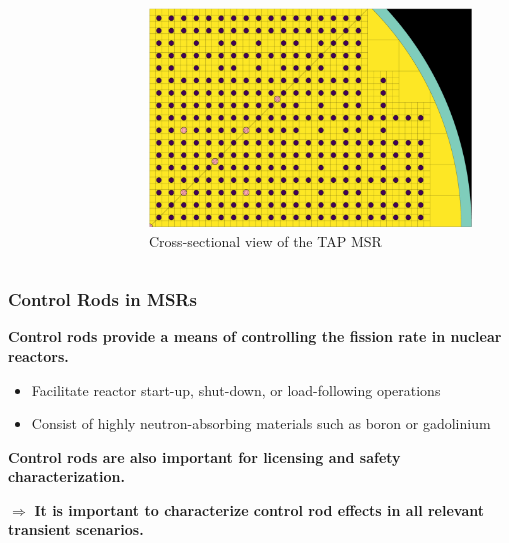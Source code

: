 \begin{frame}
\begin{columns}
\begin{figure}
{      \cite{liu_sensitivityuncertainty_2020}}
    \end{figure}
    \begin{figure}
      \centering
      \includegraphics[width=.5\columnwidth]{images/tap-msr-rods}
      \caption{\footnotesize Cross-sectional view of the TAP MSR \cite{lee_neutronics_2020}}
    \end{figure}
    \hfill
  \end{columns}
\end{frame}

\begin{frame}
  \frametitle{Control Rods in MSRs}
  \textbf{Control rods provide a means of controlling the fission rate in nuclear reactors.} 
  \begin{itemize}
    \item Facilitate reactor start-up, shut-down, or load-following operations
    \item Consist of highly neutron-absorbing materials such as boron or gadolinium
  \end{itemize}
  \textbf{Control rods are also important for licensing and safety characterization.}

  $\Rightarrow$ \textbf{It is important to characterize control rod effects in all relevant
  transient scenarios.}

\end{frame}

